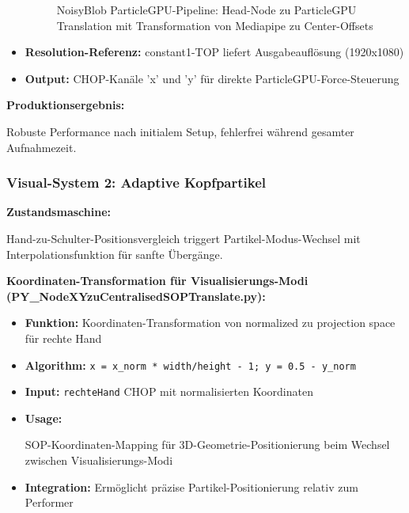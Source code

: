 \begin{itemize}
\begin{figure}[htbp]
    \centering
    \caption{NoisyBlob ParticleGPU-Pipeline: Head-Node zu ParticleGPU Translation mit Transformation von Mediapipe zu Center-Offsets}
    \label{fig:particle_translation}
\end{figure}
    \item \textbf{Resolution-Referenz:} constant1-TOP liefert Ausgabeauflösung (1920x1080)
    \item \textbf{Output:} CHOP-Kanäle 'x' und 'y' für direkte ParticleGPU-Force-Steuerung
\end{itemize}

\textbf{Produktionsergebnis:} \raggedright Robuste Performance nach initialem Setup, fehlerfrei während gesamter Aufnahmezeit.

\subsubsection{Visual-System 2: Adaptive Kopfpartikel}

\textbf{Zustandsmaschine:} \raggedright Hand-zu-Schulter-Positionsvergleich triggert Partikel-Modus-Wechsel mit Interpolationsfunktion für sanfte Übergänge.

\textbf{Koordinaten-Transformation für Visualisierungs-Modi (PY\_NodeXYzuCentralisedSOPTranslate.py):}
\begin{itemize}
    \item \textbf{Funktion:} Koordinaten-Transformation von normalized zu projection space für rechte Hand
    \item \textbf{Algorithm:} \texttt{x = x\_norm * width/height - 1; y = 0.5 - y\_norm}
    \item \textbf{Input:} \texttt{rechteHand} CHOP mit normalisierten Koordinaten
    \item \textbf{Usage:} \raggedright SOP-Koordinaten-Mapping für 3D-Geometrie-Positionierung beim Wechsel zwischen Visualisierungs-Modi
    \item \textbf{Integration:} Ermöglicht präzise Partikel-Positionierung relativ zum Performer
\end{itemize}

